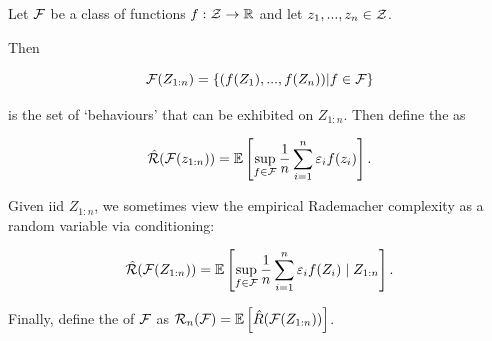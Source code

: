 \documentclass[11pt]{scrartcl}
\begin{document}
\begin{definition}
    Let $\mathcal{F}$ be a class of functions $f : \mathcal{Z} \rightarrow \mathbb R$ and let $z_1, ... , z_n \in \mathcal{Z}$.
    
    Then
    
    \begin{equation}
        \mathcal{F}(Z_{1:n}) = \{ (f(Z_1), ... , f(Z_n)) | f \in \mathcal{F} \}
    \end{equation}
    
    is the set of `behaviours' that can be exhibited on $Z_{1:n}$.
    Then define the  as 
    
    \begin{equation}
    \label{empirical raddy}
        \hat{\mathcal{R}} (\mathcal{F}(z_{1:n})) = \mathbb{E} \left[  \sup_{f \in \mathcal{F}} \frac1n \sum_{i=1}^n \varepsilon_i f(z_i)  \right].
    \end{equation}
    
    
    Given iid $Z_{1:n}$, we sometimes view the empirical Rademacher complexity as a random variable via conditioning:
    
    \begin{equation}
        \hat{\mathcal{R}} (\mathcal{F}(Z_{1:n})) = \mathbb{E} \left[  \sup_{f \in \mathcal{F}} \frac1n \sum_{i=1}^n \varepsilon_i f(Z_i) \mid Z_{1:n}  \right].
    \label{Empirical rademacher conditioning}
    \end{equation}

    Finally, define the  of $\mathcal{F}$ as $\mathcal{R}_n(\mathcal{F}) = \mathbb{E} \left[ \hat{R}(\mathcal{F}(Z_{1:n})) \right]$.
\end{definition}


\end{document}
